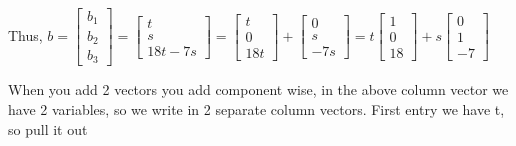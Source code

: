 \documentclass[11pt]{article}
\begin{document}
Thus, \(b = \begin{bmatrix}b_1\\b_2\\b_3\end{bmatrix} = \begin{bmatrix}t\\s\\18t-7s\end{bmatrix} = \begin{bmatrix}t\\0\\18t\end{bmatrix} + \begin{bmatrix}0\\s\\-7s\end{bmatrix} = t\begin{bmatrix}1\\0\\18\end{bmatrix} + s\begin{bmatrix}0\\1\\-7\end{bmatrix}\)

When you add 2 vectors you add component wise, in the above column vector we have 2 variables, so we write in 2 separate column vectors. First entry we have t, so pull it out
\end{document}
